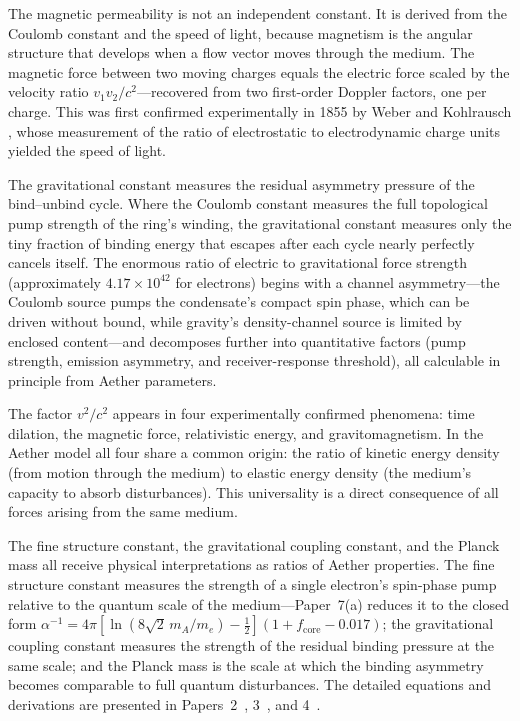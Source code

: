 \documentclass[12pt,letterpaper]{article}
\begin{document}
The magnetic permeability is not an independent constant.  It is derived from the
Coulomb constant and the speed of light, because magnetism is the angular structure
that develops when a flow vector moves through the medium.  The magnetic force between
two moving charges equals the electric force scaled by the velocity ratio $v_1 v_2/c^2$---recovered
from two first-order Doppler factors, one per charge.
This was first confirmed experimentally in 1855 by Weber and Kohlrausch
\cite{weber1856}, whose measurement of the ratio of electrostatic to electrodynamic
charge units yielded the speed of light.

The gravitational constant measures the residual asymmetry pressure of the bind--unbind
cycle.  Where the Coulomb constant measures the full topological pump strength
of the ring's winding, the gravitational constant measures only the tiny
fraction of binding energy that escapes after each cycle nearly perfectly
cancels itself.  The enormous ratio of electric to gravitational force strength
(approximately $4.17 \times 10^{42}$ for electrons) begins with a channel
asymmetry---the Coulomb source pumps the condensate's compact spin phase, which
can be driven without bound, while gravity's density-channel source is limited
by enclosed content---and decomposes further into quantitative factors (pump
strength, emission asymmetry, and receiver-response threshold), all calculable
in principle from Aether parameters.

The factor $v^2/c^2$ appears in four experimentally confirmed phenomena: time dilation,
the magnetic force, relativistic energy, and gravitomagnetism.  In the Aether model all
four share a common origin: the ratio of kinetic energy density (from motion through
the medium) to elastic energy density (the medium's capacity to absorb disturbances).
This universality is a direct consequence of all forces arising from the same medium.

The fine structure constant, the gravitational coupling constant, and the Planck mass
all receive physical interpretations as ratios of Aether properties.  The fine structure
constant measures the strength of a single electron's spin-phase pump relative
to the quantum scale of the medium---Paper~7(a) reduces it to the closed form
$\alpha^{-1} = 4\pi[\ln(8\sqrt{2}\,m_A/m_e) - \tfrac12](1+f_{\mathrm{core}}-0.017)$; the gravitational coupling constant
measures the strength of the residual binding pressure at the same scale; and the
Planck mass is the scale at which the binding asymmetry becomes comparable to full
quantum disturbances.
The detailed equations and derivations are presented in
Papers~2~\cite{otto-relativity}, 3~\cite{otto-gravity},
and 4~\cite{otto-em}.
\end{document}
